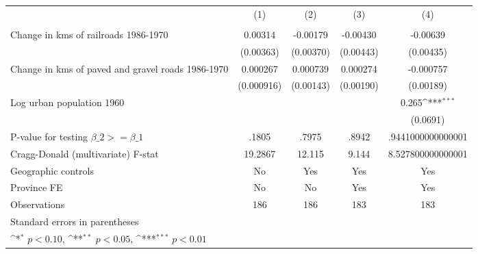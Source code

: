 {
\def\sym#1{\ifmmode^{#1}\else\(^{#1}\)\fi}
\begin{tabular}{l*{4}{c}}
\hline\hline
                &\multicolumn{1}{c}{(1)}&\multicolumn{1}{c}{(2)}&\multicolumn{1}{c}{(3)}&\multicolumn{1}{c}{(4)}\\
                &\multicolumn{1}{c}{}&\multicolumn{1}{c}{}&\multicolumn{1}{c}{}&\multicolumn{1}{c}{}\\
\hline
Change in kms of railroads 1986-1970&  0.00314         & -0.00179         & -0.00430         & -0.00639         \\
                &(0.00363)         &(0.00370)         &(0.00443)         &(0.00435)         \\
[1em]
Change in kms of paved and gravel roads 1986-1970& 0.000267         & 0.000739         & 0.000274         &-0.000757         \\
                &(0.000916)         &(0.00143)         &(0.00190)         &(0.00189)         \\
[1em]
Log urban population 1960&                  &                  &                  &    0.265\sym{***}\\
                &                  &                  &                  & (0.0691)         \\
\hline
P-value for testing $\beta\_{2} >= \beta\_{1}$&    .1805         &    .7975         &    .8942         &.9441000000000001         \\
Cragg-Donald (multivariate) F-stat&  19.2867         &   12.115         &    9.144         &8.527800000000001         \\
Geographic controls&       No         &      Yes         &      Yes         &      Yes         \\
Province FE     &       No         &       No         &      Yes         &      Yes         \\
Observations    &      186         &      186         &      183         &      183         \\
\hline\hline
\multicolumn{5}{l}{\footnotesize Standard errors in parentheses}\\
\multicolumn{5}{l}{\footnotesize \sym{*} \(p<0.10\), \sym{**} \(p<0.05\), \sym{***} \(p<0.01\)}\\
\end{tabular}
}
